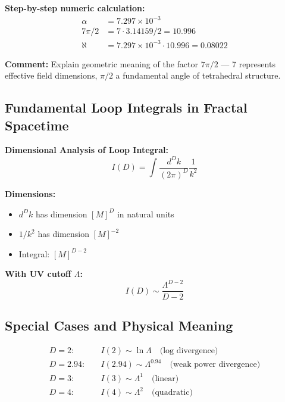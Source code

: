 \documentclass[12pt,a4paper]{article}
\newcommand{\alphagem}{\alpha}      %
\begin{document}
\textbf{Step-by-step numeric calculation:}
\begin{align}
	\alphagem &= 7.297 \times 10^{-3} \\
	7\pi/2 &= 7 \cdot 3.14159 / 2 = 10.996 \\
	\aleph &= 7.297 \times 10^{-3} \cdot 10.996 = 0.08022
\end{align}

\textbf{Comment:} Explain geometric meaning of the factor $7\pi/2$ — 7 represents effective field dimensions, $\pi/2$ a fundamental angle of tetrahedral structure.

\subsection{Fundamental Loop Integrals in Fractal Spacetime}

\textbf{Dimensional Analysis of Loop Integral:}
\begin{equation}
	I(D) = \int \frac{d^D k}{(2\pi)^D} \frac{1}{k^2}
\end{equation}

\textbf{Dimensions:}
\begin{itemize}
	\item $d^D k$ has dimension $[M]^D$ in natural units
	\item $1/k^2$ has dimension $[M]^{-2}$
	\item Integral: $[M]^{D-2}$
\end{itemize}

\textbf{With UV cutoff $\Lambda$:}
\begin{equation}
	I(D) \sim \frac{\Lambda^{D-2}}{D-2}
\end{equation}

\subsection{Special Cases and Physical Meaning}

\begin{align}
	D=2: &\quad I(2) \sim \ln \Lambda \quad \text{(log divergence)} \\
	D=2.94: &\quad I(2.94) \sim \Lambda^{0.94} \quad \text{(weak power divergence)} \\
	D=3: &\quad I(3) \sim \Lambda^{1} \quad \text{(linear)} \\
	D=4: &\quad I(4) \sim \Lambda^{2} \quad \text{(quadratic)}
\end{align}
\end{document}
